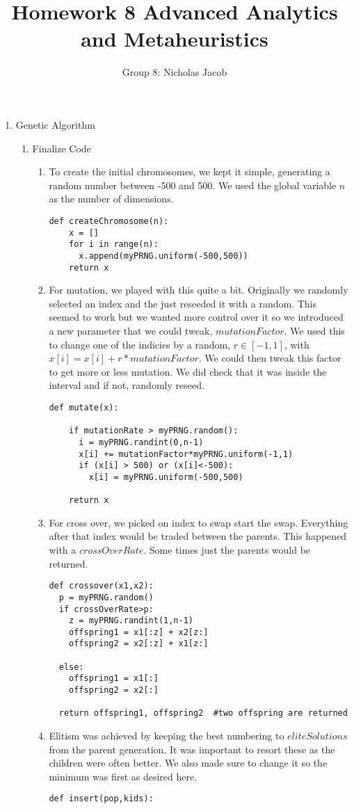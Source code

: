 \documentclass[11pt]{article}
\author{Group 8: Nicholas Jacob}
\title{Homework 8 Advanced Analytics and Metaheuristics}
\begin{document}
\maketitle

\begin{enumerate}
\item Genetic Algorithm
\begin{enumerate}
\item Finalize Code
\begin{enumerate}
\item To create the initial chromosomes, we kept it simple, generating a random number between -500 and 500.  We used the global variable $n$ as the number of dimensions.
\begin{verbatim}
def createChromosome(n):
    x = []   
    for i in range(n):
      x.append(myPRNG.uniform(-500,500))
    return x
\end{verbatim}
\item For mutation, we played with this quite a bit.  Originally we randomly selected an index and the just reseeded it with a random.  This seemed to work but we wanted more control over it so we introduced a new parameter that we could tweak, $mutationFactor$.  We used this to change one of the indicies by a random, $r\in[-1,1]$, with $x[i] = x[i] +r*mutationFactor$.  We could then tweak this factor to get more or less mutation.  We did check that it was inside the interval and if not, randomly reseed.
\begin{verbatim}
def mutate(x):

    if mutationRate > myPRNG.random():
      i = myPRNG.randint(0,n-1)
      x[i] += mutationFactor*myPRNG.uniform(-1,1)
      if (x[i] > 500) or (x[i]<-500):
        x[i] = myPRNG.uniform(-500,500)

    return x
\end{verbatim} 

\item For cross over, we picked on index to swap start the swap.  Everything after that index would be traded between the parents.  This happened with a $crossOverRate$.  Some times just the parents would be returned.
\begin{verbatim}
def crossover(x1,x2):
  p = myPRNG.random()
  if crossOverRate>p:
    z = myPRNG.randint(1,n-1)
    offspring1 = x1[:z] + x2[z:]
    offspring2 = x2[:z] + x1[z:]

  else:
    offspring1 = x1[:]
    offspring2 = x2[:]

  return offspring1, offspring2  #two offspring are returned
\end{verbatim}
\item Elitism was achieved by keeping the best numbering to $eliteSolutions$ from the parent generation.  It was important to resort these as the children were often better.  We also made sure to change it so the minimum was first as desired here.
\begin{verbatim}
def insert(pop,kids):


\end{verbatim}
\end{enumerate}
\end{enumerate}
\end{enumerate}
\end{document}
